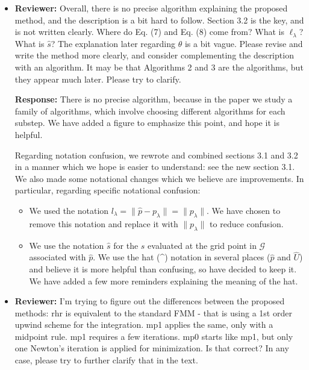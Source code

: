 \documentclass{article}
\begin{document}
\begin{itemize}

\item \textbf{Reviewer:} Overall, there is no precise algorithm
  explaining the proposed method, and the description is a bit hard to
  follow. Section 3.2 is the key, and is not written clearly. Where do
  Eq. (7) and Eq. (8) come from? What is $\ell_\lambda$? What is
  $\hat{s}$? The explanation later regarding $\theta$ is a bit
  vague. Please revise and write the method more clearly, and consider
  complementing the description with an algorithm. It may be that
  Algorithms 2 and 3 are the algorithms, but they appear much
  later. Please try to clarify.

  \textbf{Response:} There is no precise algorithm, because in the
  paper we study a family of algorithms, which involve choosing
  different algorithms for each substep. We have added a figure to
  emphasize this point, and hope it is helpful.

  Regarding notation confusion, we rewrote and combined sections 3.1
  and 3.2 in a manner which we hope is easier to understand: see the
  new section 3.1. We also made some notational changes which we
  believe are improvements. In particular, regarding specific
  notational confusion:
  \begin{itemize}
  \item We used the notation
    $l_\lambda = \|\hat{p} - p_\lambda\| = \|p_\lambda\|$. We have
    chosen to remove this notation and replace it with $\|p_\lambda\|$
    to reduce confusion.
  \item We use the notation $\hat{s}$ for the $s$ evaluated at the
    grid point in $\mathcal{G}$ associated with $\hat{p}$. We use the
    hat (\^{}) notation in several places ($\hat{p}$ and $\hat{U}$)
    and believe it is more helpful than confusing, so have decided to
    keep it. We have added a few more reminders explaining the meaning
    of the hat.
  \end{itemize}

\item \textbf{Reviewer:} I'm trying to figure out the differences
  between the proposed methods: rhr is equivalent to the standard FMM
  - that is using a 1st order upwind scheme for the integration. mp1
  applies the same, only with a midpoint rule. mp1 requires a few
  iterations. mp0 starts like mp1, but only one Newton's iteration is
  applied for minimization. Is that correct? In any case, please try
  to further clarify that in the text.


\end{itemize}
\end{document}
